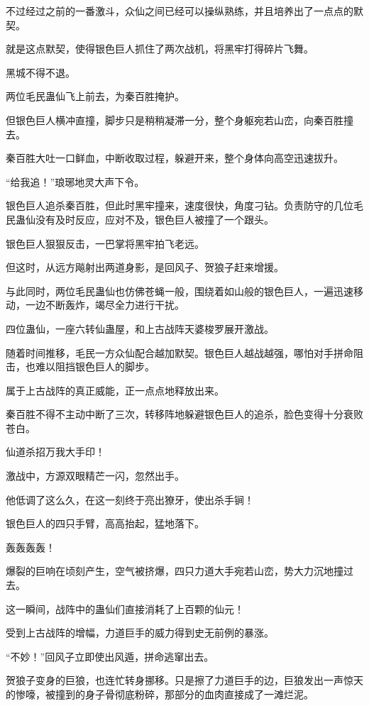\begin{this_body}
不过经过之前的一番激斗，众仙之间已经可以操纵熟练，并且培养出了一点点的默契。

就是这点默契，使得银色巨人抓住了两次战机，将黑牢打得碎片飞舞。

黑城不得不退。

两位毛民蛊仙飞上前去，为秦百胜掩护。

但银色巨人横冲直撞，脚步只是稍稍凝滞一分，整个身躯宛若山峦，向秦百胜撞去。

秦百胜大吐一口鲜血，中断收取过程，躲避开来，整个身体向高空迅速拔升。

“给我追！”琅琊地灵大声下令。

银色巨人追杀秦百胜，但此时黑牢撞来，速度很快，角度刁钻。负责防守的几位毛民蛊仙没有及时反应，应对不及，银色巨人被撞了一个跟头。

银色巨人狠狠反击，一巴掌将黑牢拍飞老远。

但这时，从远方飚射出两道身影，是回风子、贺狼子赶来增援。

与此同时，两位毛民蛊仙也仿佛苍蝇一般，围绕着如山般的银色巨人，一遍迅速移动，一边不断轰炸，竭尽全力进行干扰。

四位蛊仙，一座六转仙蛊屋，和上古战阵天婆梭罗展开激战。

随着时间推移，毛民一方众仙配合越加默契。银色巨人越战越强，哪怕对手拼命阻击，也难以阻挡银色巨人的脚步。

属于上古战阵的真正威能，正一点点地释放出来。

秦百胜不得不主动中断了三次，转移阵地躲避银色巨人的追杀，脸色变得十分衰败苍白。

仙道杀招万我大手印！

激战中，方源双眼精芒一闪，忽然出手。

他低调了这么久，在这一刻终于亮出獠牙，使出杀手锏！

银色巨人的四只手臂，高高抬起，猛地落下。

轰轰轰轰！

爆裂的巨响在顷刻产生，空气被挤爆，四只力道大手宛若山峦，势大力沉地撞过去。

这一瞬间，战阵中的蛊仙们直接消耗了上百颗的仙元！

受到上古战阵的增幅，力道巨手的威力得到史无前例的暴涨。

“不妙！”回风子立即使出风遁，拼命逃窜出去。

贺狼子变身的巨狼，也连忙转身挪移。只是擦了力道巨手的边，巨狼发出一声惊天的惨嚎，被撞到的身子骨彻底粉碎，那部分的血肉直接成了一滩烂泥。


\end{this_body}
